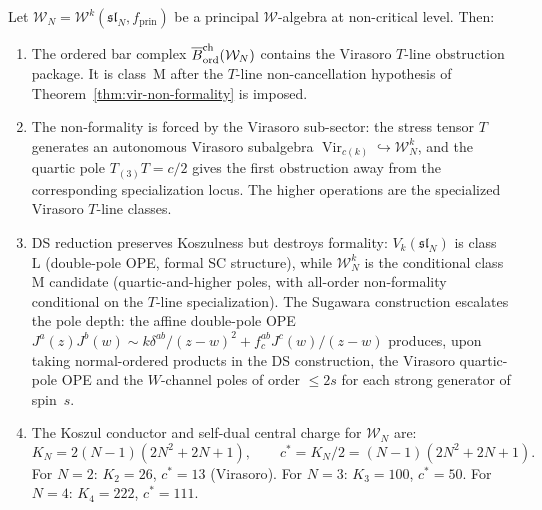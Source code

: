 \begin{theorem}
\label{thm:class-m-ds-transport}
Let $\mathcal{W}_N = \mathcal{W}^k(\mathfrak{sl}_N, f_{\mathrm{prin}})$ be a
principal $\mathcal{W}$-algebra at non-critical level. Then:
\begin{enumerate}[label=\textup{(\roman*)}]
\item The ordered bar complex
$\overline{B}^{\mathrm{ch}}_{\mathrm{ord}}(\mathcal{W}_N)$ contains the Virasoro $T$-line
obstruction package. It is class~$\mathrm{M}$ after the $T$-line
non-cancellation hypothesis of Theorem~\ref{thm:vir-non-formality} is
imposed.

\item The non-formality is forced by the Virasoro sub-sector:
the stress tensor $T$ generates an autonomous Virasoro subalgebra
$\operatorname{Vir}_{c(k)} \hookrightarrow \mathcal{W}_N^k$, and
the quartic pole $T_{(3)}T = c/2$ gives the first obstruction away from
the corresponding specialization locus. The higher operations are the
specialized Virasoro $T$-line classes.

\item DS reduction preserves Koszulness but destroys formality:
$V_k(\mathfrak{sl}_N)$ is class~$\mathrm{L}$ \textup{(}double-pole
OPE, formal SC structure\textup{)}, while
$\mathcal{W}_N^k$ is the conditional class~$\mathrm{M}$ candidate
\textup{(}quartic-and-higher poles, with all-order non-formality
conditional on the $T$-line specialization\textup{)}. The Sugawara
construction escalates the pole depth:
the affine double-pole OPE $J^a(z)J^b(w) \sim k\delta^{ab}/(z{-}w)^2
+ f^{ab}_c J^c(w)/(z{-}w)$ produces, upon taking normal-ordered
products in the DS construction, the Virasoro quartic-pole OPE and
the $W$-channel poles of order $\leq 2s$ for each strong generator
of spin~$s$.

\item The Koszul conductor and self-dual central charge for
 $\mathcal{W}_N$ are:
\[
K_N = 2(N{-}1)(2N^2{+}2N{+}1),
\qquad
c^* = K_N/2 = (N{-}1)(2N^2{+}2N{+}1).
\]
For $N = 2$: $K_2 = 26$, $c^* = 13$ \textup{(}Virasoro\textup{)}.
For $N = 3$: $K_3 = 100$, $c^* = 50$.
For $N = 4$: $K_4 = 222$, $c^* = 111$.
\end{enumerate}
\end{theorem}

